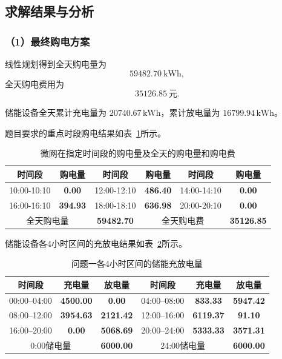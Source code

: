 \subsection{求解结果与分析}

\subsubsection*{（1）最终购电方案}

线性规划得到全天购电量为
\[
\boxed{59482.70\ \mathrm{kWh}},
\]
全天购电费用为
\[
\boxed{35126.85\ \text{元}}.
\]

储能设备全天累计充电量为 \(20740.67\,\mathrm{kWh}\)，累计放电量为 \(16799.94\,\mathrm{kWh}\)。

题目要求的重点时段购电结果如表~\ref{tab:q1_purchase_result}所示。

\begin{table}[H]
    \centering
    \caption{微网在指定时间段的购电量及全天的购电量和购电费 }
    \label{tab:q1_purchase_result}
    \begin{tabular}{|c|c|c|c|c|c|}
        \hline
        时间段 & 购电量 & 时间段 & 购电量 & 时间段 & 购电量 \\
        \hline
        10:00-10:10 & \textbf{0.00} & 12:00-12:10 & \textbf{486.40} & 14:00-14:10 & \textbf{0.00} \\
        \hline
        16:00-16:10 & \textbf{394.93} & 18:00-18:10 & \textbf{636.98} & 20:00-20:10 & \textbf{0.00} \\
        \hline
        \multicolumn{2}{|c|}{全天购电量} & \multicolumn{1}{c|}{\textbf{59482.70}} & \multicolumn{2}{c|}{全天购电费} & \multicolumn{1}{c|}{\textbf{35126.85}}\\
        \hline
    \end{tabular}
\end{table}

储能设备各4小时区间的充放电结果如表~\ref{tab:q1_storage_result}所示。

\begin{table}[H]
    \centering
    \caption{问题一各4小时区间的储能充放电量}
    \label{tab:q1_storage_result}
    \begin{tabular}{|c|c|c|c|c|c|}
        \hline
        时间段 & 充电量 & 放电量 & 时间段 & 充电量 & 放电量 \\
        \hline
        00:00--04:00 & \textbf{4500.00} & \textbf{0.00} & 04:00--08:00 & \textbf{833.33} & \textbf{5947.42} \\
        \hline
        08:00--12:00 & \textbf{3954.63} & \textbf{2121.42} & 12:00--16:00 & \textbf{6119.37} & \textbf{91.10} \\
        \hline
        16:00--20:00 & \textbf{0.00} & \textbf{5068.69} & 20:00--24:00 & \textbf{5333.33} & \textbf{3571.31} \\
        \hline
        \multicolumn{2}{|c|}{0:00储电量} & \multicolumn{1}{|c|}{\textbf{6000.00}} & \multicolumn{2}{c|}{24:00储电量} & \multicolumn{1}{c|}{\textbf{6000.00}}\\
        \hline
    \end{tabular}
\end{table}

